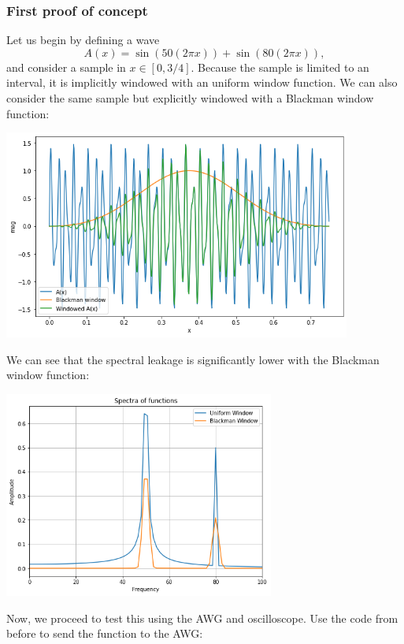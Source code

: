 \documentclass{article}
\begin{document}
    \subsubsection*{First proof of concept}
    \noindent Let us begin by defining a wave
    $$A(x) = \sin(50(2\pi x)) + \sin(80(2\pi x)),$$
    and consider a sample in $x \in [0, 3/4].$ Because the sample is limited to an interval, it is implicitly windowed with an uniform window function. We can also consider the same sample but explicitly windowed with a Blackman window function:
    \begin{mdframed}[backgroundcolor=gray!20, align = center, userdefinedwidth = 4.8in]
    \includegraphics[width = 4.5in]{img/window_function_plot.png}
    \end{mdframed}
    We can see that the spectral leakage is significantly lower with the Blackman window function:
    \begin{mdframed}[backgroundcolor=gray!20, align = center, userdefinedwidth = 3.8in]
    \includegraphics[width = 3.5in]{img/WindowedLeakage.png}
    \end{mdframed}
    Now, we proceed to test this using the AWG and oscilloscope. Use the code from before to send the function to the AWG:
\end{document}
